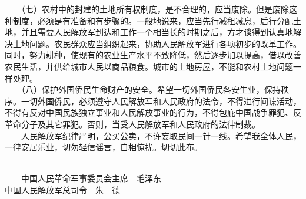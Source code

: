 \documentclass[cn,11pt,chinese]{elegantbook}
\begin{document}
　　（七）农村中的封建的土地所有权制度，是不合理的，应当废除。但是废除这种制度，必须是有准备和有步骤的。一般地说来，应当先行减租减息，后行分配土地，并且需要人民解放军到达和工作一个相当长的时期之后，方才谈得到认真地解决土地问题。农民群众应当组织起来，协助人民解放军进行各项初步的改革工作。同时，努力耕种，使现有的农业生产水平不致降低，然后逐步加以提高，借以改善农民生活，并供给城市人民以商品粮食。城市的土地房屋，不能和农村土地问题一样处理。\\
　　（八）保护外国侨民生命财产的安全。希望一切外国侨民各安生业，保持秩序。一切外国侨民，必须遵守人民解放军和人民政府的法令，不得进行间谍活动，不得有反对中国民族独立事业和人民解放事业的行为，不得包庇中国战争罪犯、反革命分子及其它罪犯。否则，当受人民解放军和人民政府的法律制裁。\\
　　人民解放军纪律严明，公买公卖，不许妄取民间一针一线。希望我全体人民，一律安居乐业，切勿轻信谣言，自相惊扰。切切此布。\\
　　\begin{flushright}
　　中国人民革命军事委员会主席　毛泽东\\
中国人民解放军总司令　朱　德
　　\end{flushright}
\end{document}
